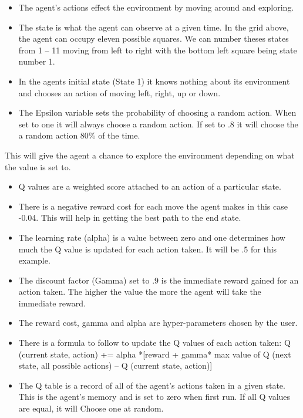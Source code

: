 \begin{itemize}
	\item The agent’s actions effect the environment by moving around and exploring.
	\item	The state is what the agent can observe at a given time. In the grid above, the agent can occupy eleven possible squares. We can number theses states from 1 – 11 moving from left to right with the bottom left square being state number 1.
	\item	In the agents initial state (State 1) it knows nothing about its environment and chooses an action of moving left, right, up or down.
	\item	The Epsilon variable sets the probability of choosing a random action. When set to one it will always choose a random action. If set to .8 it will choose the a random action 80\% of the time.
\end{itemize}
This will give the agent a chance to explore the environment depending on what the value is set to.
\begin{itemize}
\item Q values are a weighted score attached to an action of a particular state.
\item There is a negative reward cost for each move the agent makes in this case -0.04. This will help in getting the best path to the end state.
\item The learning rate (alpha) is a value between zero and one determines how much the Q value is updated for each action taken. It will be .5 for this example.
\item The discount factor (Gamma) set to .9 is the immediate reward gained for an action taken. The higher the value the more the agent will take the immediate reward.
\item The reward cost, gamma and alpha are hyper-parameters chosen by the user.
\item There is a formula to follow to update the Q values of each action taken:
Q (current state, action) += alpha *[reward + gamma* max value of Q (next state, all possible actions) – Q (current state, action)]
\item The Q table is a record of all of the agent’s actions taken in a given state. This is the agent’s memory and is set to zero when first run. If all Q values are equal, it will 
Choose one at random.
\end{itemize}




